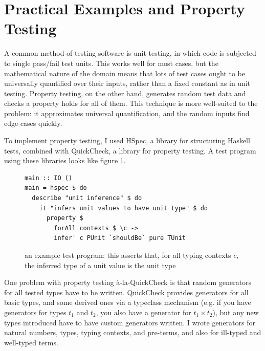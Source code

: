 \section{Practical Examples and Property Testing}
A common method of testing software is unit testing, in which code is subjected to single pass/fail test units.
This works well for most cases, but the mathematical nature of the domain means that lots of test cases ought to be universally quantified over their inputs, rather than a fixed constant as in unit testing.
Property testing, on the other hand, generates random test data and checks a property holds for all of them.
This technique is more well-suited to the problem: it approximates universal quantification, and the random inputs find edge-cases quickly.

To implement property testing, I used HSpec\cite{hspec}, a library for structuring Haskell tests, combined with QuickCheck\cite{quickcheck}, a library for property testing.
A test program using these libraries looks like figure \ref{fig:example-test}.

\begin{figure}
\begin{verbatim}
main :: IO ()
main = hspec $ do
  describe "unit inference" $ do
    it "infers unit values to have unit type" $ do
      property $
        forAll contexts $ \c ->
        infer' c PUnit `shouldBe` pure TUnit
\end{verbatim}
\caption{an example test program: this asserts that, for all typing contexts \(c\), the inferred type of a unit value is the unit type}
\label{fig:example-test}
\end{figure}

One problem with property testing \`a-la-QuickCheck is that random generators for all tested types have to be written.
QuickCheck provides generators for all basic types, and some derived ones via a typeclass mechanism (e.g. if you have generators for types \(t_1\) and \(t_2\), you also have a generator for \(t_1 \times t_2\)), but any new types introduced have to have custom generators written.
I wrote generators for natural numbers, types, typing contexts, and pre-terms, and also for ill-typed and well-typed terms.

